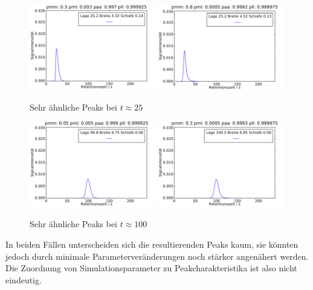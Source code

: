 \begin{figure}[h]
\includegraphics[width=0.49\textwidth]{bilder/kombis/1peak1_kombi1}
\includegraphics[width=0.49\textwidth]{bilder/kombis/1peak1_kombi2}
\caption{Sehr ähnliche Peaks bei $t \approx 25$}
\label{2kombis_1}
\end{figure}

\begin{figure}[h]
\includegraphics[width=0.49\textwidth]{bilder/kombis/1peak2_kombi1}
\includegraphics[width=0.49\textwidth]{bilder/kombis/1peak2_kombi2}
\caption{Sehr ähnliche Peaks bei $t \approx 100$}
\label{2kombis_2}
\end{figure}

In beiden Fällen unterscheiden sich die resultierenden Peaks kaum, sie könnten jedoch durch minimale Parameterveränderungen noch stärker angenähert werden. Die Zuordnung von Simulationsparameter zu Peakcharakteristika ist also nicht eindeutig.

